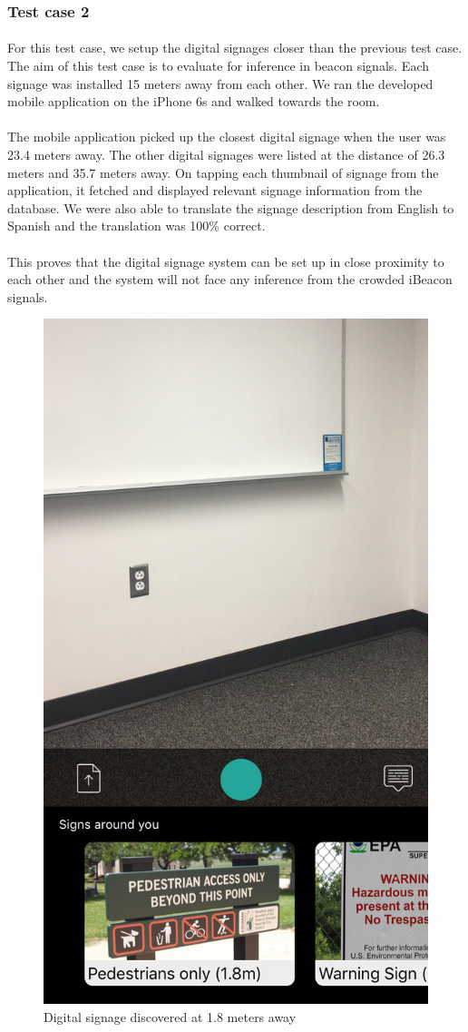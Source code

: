\documentclass[12pt]{article}
\begin{document}
\subsubsection{Test case 2}
\label{one2one}
\paragraph{}For this test case, we setup the digital signages closer than the previous test case. The aim of this test case is to evaluate for inference in beacon signals. Each signage was installed  15 meters away from each other. We ran the developed mobile application on the iPhone 6s and walked towards the room.

\paragraph{}The mobile application picked up the closest digital signage when the user was 23.4 meters away. The other digital signages were listed at the distance of 26.3 meters and 35.7 meters away. On tapping each thumbnail of signage from the application, it fetched and displayed relevant signage information from the database. We were also able to translate the signage description from English to Spanish and the translation was 100\% correct.

\paragraph{}This proves that the digital signage system can be set up in close proximity to each other and the system will not face any inference from the crowded iBeacon signals. 

       \begin{figure}[H]
	\centering
	\includegraphics[width=0.5\linewidth]{media/case1.png}
	\caption{Digital signage discovered at 1.8 meters away}
	\label{fig:eng}
\end{figure} 
\end{document}
